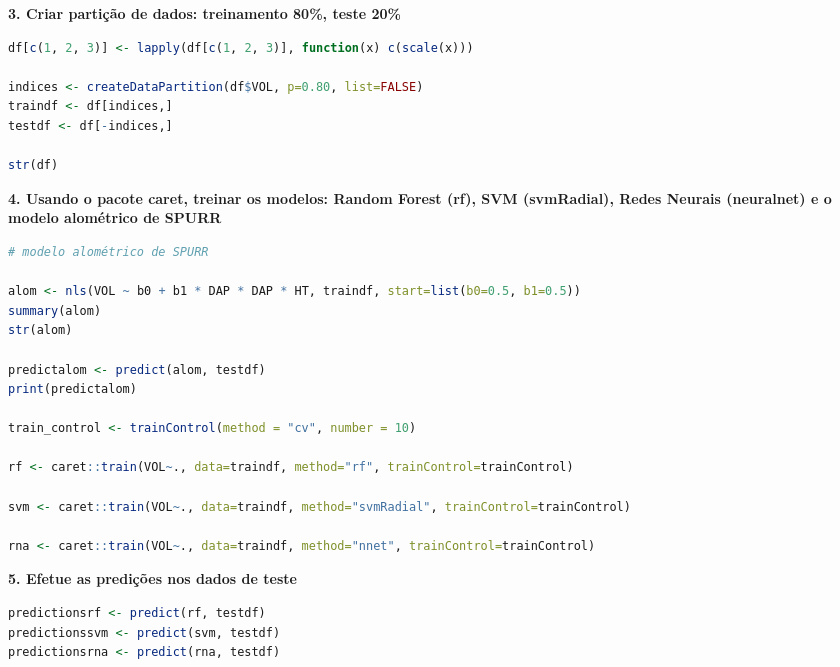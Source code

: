 \begin{adjustwidth}{1em}{}
\textbf{3. Criar partição de dados: treinamento 80\%, teste 20\%}
\end{adjustwidth}
\begin{lstlisting}[language=R, style=input]
df[c(1, 2, 3)] <- lapply(df[c(1, 2, 3)], function(x) c(scale(x)))

indices <- createDataPartition(df$VOL, p=0.80, list=FALSE)
traindf <- df[indices,]
testdf <- df[-indices,]

str(df)
\end{lstlisting}

\begin{adjustwidth}{1em}{}
\textbf{4. Usando o pacote {\textquotedbl}caret{\textquotedbl}, treinar os modelos: Random Forest (rf), SVM
(svmRadial), Redes Neurais (neuralnet) e o modelo alométrico de SPURR}
\end{adjustwidth}
\begin{lstlisting}[language=R, style=input]
# modelo alométrico de SPURR

alom <- nls(VOL ~ b0 + b1 * DAP * DAP * HT, traindf, start=list(b0=0.5, b1=0.5))
summary(alom)
str(alom)

predictalom <- predict(alom, testdf)
print(predictalom)

train_control <- trainControl(method = "cv", number = 10)

rf <- caret::train(VOL~., data=traindf, method="rf", trainControl=trainControl)

svm <- caret::train(VOL~., data=traindf, method="svmRadial", trainControl=trainControl)

rna <- caret::train(VOL~., data=traindf, method="nnet", trainControl=trainControl)
\end{lstlisting}

\begin{adjustwidth}{1em}{}
\textbf{5. Efetue as predições nos dados de teste}
\end{adjustwidth}
\begin{lstlisting}[language=R, style=input]
predictionsrf <- predict(rf, testdf)
predictionssvm <- predict(svm, testdf)
predictionsrna <- predict(rna, testdf)
\end{lstlisting}

